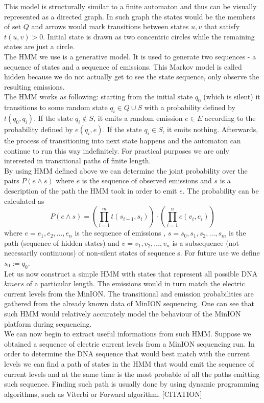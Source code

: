This model is structurally similar to a finite automaton and thus can be visually represented as a directed graph. In such graph the states would be the members of set $Q$ and arrows would mark transitions between states $u,v$ that satisfy $t(u,v) > 0$. Initial state is drawn as two concentric circles while the remaining states are just a circle.\\
The HMM we use is a generative model. It is used to generate two sequences - a sequence of states and a sequence of emissions. This Markov model is called hidden because we do not actually get to see the state sequence, only observe the resulting emissions.\\

The HMM works as following: starting from the initial state $q_0$ (which is silent) it transitions to some random state $q_i \in Q \cup S$ with a probability defined by $t(q_0, q_i)$. If the state $q_i \not\in S$, it emits a random emission $e \in E$ according to the probability defined by $e(q_i, e)$. If the state $q_i \in S$, it emits nothing. Afterwards, the process of transitioning into next state happens and the automaton can continue to run this way indefinitely. 
For practical purposes we are only interested in transitional paths of finite length.\\

By using HMM defined above we can determine the joint probability over the pairs $P(e \land s)$ where $e$ is the sequence of observed emissions and $s$ is a description of the path the HMM took in order to emit $e$. The probability can be calculated as
$$P(e \land s) = (\prod_{i=1}^{m}{t(s_{i-1}, s_i)}) \cdot (\prod_{i=1}^{n}{e(v_i, e_i)})$$
where $e = e_1,e_2,\dots,e_n$ is the sequence of emissions , $s = s_0, s_1, s_2, \dots, s_m$ is the path (sequence of hidden states) and $v = v_1, v_2, \dots, v_n$ is a subsequence (not necessarily continuous) of non-silent states of sequence s. For future use we define $s_0 := q_0$.\\

Let us now construct a simple HMM with states that represent all possible DNA $kmers$ of a particular length. The emissions would in turn match the electric current levels from the MinION. The transitional and emission probabilities are gathered from the already known data of MinION sequencing. One can see that such HMM would relatively accurately model the behaviour of the MinION platform during sequencing.\\
We can now begin to extract useful informations from such HMM. Suppose we obtained a sequence of electric current levels from a MinION sequencing run. In order to determine the DNA sequence that would best match with the current levels we can find a path of states in the HMM that would emit the sequence of current levels and at the same time is the most probable of all the paths emitting such sequence.
Finding such path is usually done by using dynamic programming algorithms, such as Viterbi or Forward algorithm. [CITATION]

